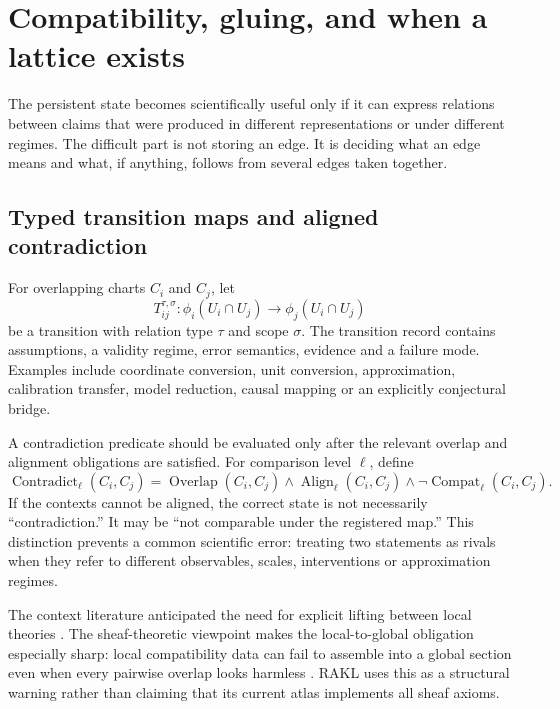 \documentclass[11pt]{article}
\newcommand{\Compat}{\operatorname{Compat}}
\newcommand{\Align}{\operatorname{Align}}
\newcommand{\Overlap}{\operatorname{Overlap}}
\newcommand{\Contradict}{\operatorname{Contradict}}
\begin{document}
\section{Compatibility, gluing, and when a lattice exists}

The persistent state becomes scientifically useful only if it can express relations between claims that were produced in different representations or under different regimes. The difficult part is not storing an edge. It is deciding what an edge means and what, if anything, follows from several edges taken together.

\subsection{Typed transition maps and aligned contradiction}

For overlapping charts \(C_i\) and \(C_j\), let
\[
T_{ij}^{\tau,\sigma}:\phi_i(U_i\cap U_j)\longrightarrow\phi_j(U_i\cap U_j)
\]
be a transition with relation type \(\tau\) and scope \(\sigma\). The transition record contains assumptions, a validity regime, error semantics, evidence and a failure mode. Examples include coordinate conversion, unit conversion, approximation, calibration transfer, model reduction, causal mapping or an explicitly conjectural bridge.

A contradiction predicate should be evaluated only after the relevant overlap and alignment obligations are satisfied. For comparison level \(\ell\), define
\[
\Contradict_{\ell}(C_i,C_j)=
\Overlap(C_i,C_j)\land
\Align_{\ell}(C_i,C_j)\land
\neg\Compat_{\ell}(C_i,C_j).
\]
If the contexts cannot be aligned, the correct state is not necessarily ``contradiction.'' It may be ``not comparable under the registered map.'' This distinction prevents a common scientific error: treating two statements as rivals when they refer to different observables, scales, interventions or approximation regimes.

The context literature anticipated the need for explicit lifting between local theories \cite{mccarthy1993,giunchiglia1993}. The sheaf-theoretic viewpoint makes the local-to-global obligation especially sharp: local compatibility data can fail to assemble into a global section even when every pairwise overlap looks harmless \cite{abramsky2011,curry2014,robinson2017}. RAKL uses this as a structural warning rather than claiming that its current atlas implements all sheaf axioms.
\end{document}
